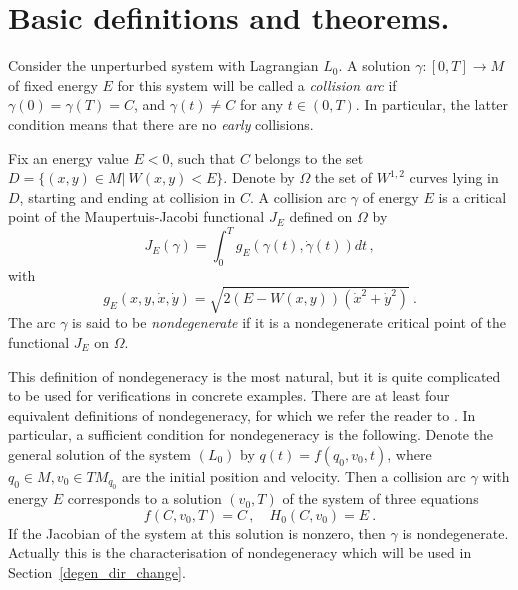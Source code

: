 \documentclass[a4paper]{article}
\begin{document}
\section{Basic definitions and theorems.}
\label{bolotin}
Consider the unperturbed system with Lagrangian $L_0$.  A solution
$\gamma:[0,T]\rightarrow M$ of fixed energy $E$ for this system will
be called a \emph{collision arc} if $\gamma(0)=\gamma(T)=C$, and
$\gamma(t)\neq C$ for any $t\in (0,T)$. In particular, the latter
condition means that there are no \emph{early} collisions.

Fix an energy value $E<0$, such that $C$ belongs to the set
$D=\{(x,y)\in M|\ W(x,y)<E\}$.  Denote by $\Omega$ the set of
$W^{1,2}$ curves lying in $D$, starting and ending at collision in
$C$.  A collision arc $\gamma $ of energy $E$ is a critical point of
the Maupertuis-Jacobi functional $J_E$ defined on $\Omega$ by
\[
J_E(\gamma)=\int_0^Tg_E(\gamma(t),\dot\gamma(t))dt\,, 
\]
with 
\[
g_E(x,y, \dot{x},\dot{y})=\sqrt{2(E-W(x,y))(\dot{x}^2 + \dot{y}^2)}\ .
\]
The arc $\gamma$ is said to be \emph{nondegenerate} if it is a
nondegenerate critical point of the functional $J_E$ on $\Omega$.

This definition of nondegeneracy is the most natural, but it is quite
complicated to be used for verifications in concrete examples. There
are at least four equivalent definitions of nondegeneracy, for which
we refer the reader to \cite{BM1}.  In particular, a sufficient
condition for nondegeneracy is the following.  Denote the general
solution of the system $(L_0)$ by $q(t)=f(q_0,v_0,t)$, where $q_0 \in
M, v_0 \in TM_{q_0}$ are the initial position and velocity.  Then a
collision arc $\gamma$ with energy $E$ corresponds to a solution
$(v_0,T)$ of the system of three equations
\[
f(C,v_0,T)=C\,, \quad H_0(C,v_0)=E\ .
\]
If the Jacobian of the system at this solution is nonzero, then
$\gamma$ is nondegenerate.  Actually this is the characterisation of
nondegeneracy which will be used in Section~\ref{degen_dir_change}.
\end{document}

